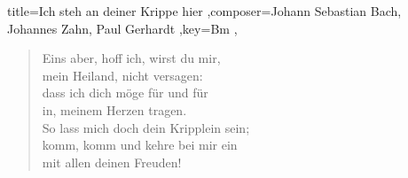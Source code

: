 \documentclass[]{leadsheet}
\begin{document}
\begin{song}{title={Ich steh an deiner Krippe hier
},composer={Johann Sebastian Bach, Johannes Zahn, Paul Gerhardt
},key={Bm
},}
\begin{verse}
Eins aber, hoff ich, wirst du mir, \\
mein Heiland, nicht versagen: \\
dass ich dich möge für und für \\
in, meinem Herzen tragen. \\
So lass mich doch dein Kripplein sein; \\
komm, komm und kehre bei mir ein \\
mit allen deinen Freuden! \\
\end{verse}

\end{song}
\end{document}
